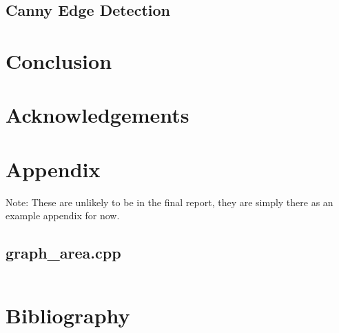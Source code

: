 \documentclass[12pt,english]{article}
\begin{document}
\subsection{Canny Edge Detection}

\section{Conclusion}

\section{Acknowledgements}

\section{Appendix}
Note: These are unlikely to be in the final report, they are simply there as an example appendix for now.
\subsection*{graph\_area.cpp}
\label{code:grapharea}
\inputminted[breakanywhere=true, tabsize=4]{cpp}{../code/elliptic_fourier/graph_area.cpp}

\section{Bibliography}


\end{document}
